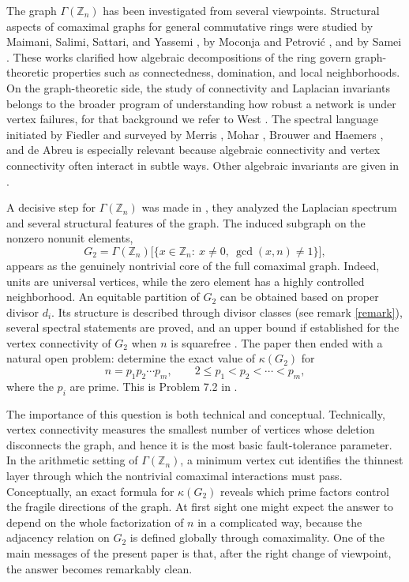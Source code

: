 \documentclass[12pt]{article}
\theoremstyle{definition}
\begin{document}
	The graph $\Gamma(\mathbb Z_n)$ has been investigated from several viewpoints. Structural aspects of comaximal graphs for general commutative rings were studied by Maimani, Salimi, Sattari, and Yassemi \cite{Maimani2008}, by Moconja and Petrović \cite{MoconjaPetrovic2011}, and by Samei \cite{Samei2014}. These works clarified how algebraic decompositions of the ring govern graph-theoretic properties such as connectedness, domination, and local neighborhoods. On the graph-theoretic side, the study of connectivity and Laplacian invariants belongs to the broader program of understanding how robust a network is under vertex failures, for that background we refer to West \cite{West2001}. The spectral language initiated by Fiedler \cite{Fiedler1973} and surveyed by Merris \cite{Merris1994}, Mohar \cite{Mohar1991}, Brouwer and Haemers \cite{BrouwerHaemers2012}, and de Abreu \cite{deAbreu2007} is especially relevant because algebraic connectivity and vertex connectivity often interact in subtle ways. Other algebraic invariants are given in \cite{bilalcumn,bilaliaaecc,bilaliac,bilalijaa,bilalijpam}.
	
	A decisive step for $\Gamma(\mathbb Z_n)$ was made in \cite{Banerjee2022,afkhami}, they analyzed the Laplacian spectrum and several structural features of the graph. The induced subgraph on the nonzero nonunit elements,
	$$
	G_2=\Gamma(\mathbb Z_n)\big[\{x\in \mathbb Z_n:\ x\neq 0,\ \gcd(x,n)\neq 1\}\big],
	$$
	appears as the genuinely nontrivial core of the full comaximal graph. Indeed, units are universal vertices, while the zero element has a highly controlled neighborhood. An equitable partition of $G_2$ can be obtained based on proper divisor $d_{i}$. Its structure is described through divisor classes (see remark \ref{remark}), several spectral statements are proved, and  an upper bound if established for the vertex connectivity of $G_2$ when $n$ is squarefree \cite{Banerjee2022,afkhami}. The paper \cite{Banerjee2022} then ended with a natural open problem: determine the exact value of $\kappa(G_2)$ for
	$$
	n=p_1p_2\cdots p_m,\qquad 2\leq p_1<p_2<\cdots<p_m,
	$$
	where the $p_i$ are prime. This is Problem 7.2 in \cite{Banerjee2022}.
	
	The importance of this question is both technical and conceptual. Technically, vertex connectivity measures the smallest number of vertices whose deletion disconnects the graph, and hence it is the most basic fault-tolerance parameter. In the arithmetic setting of $\Gamma(\mathbb Z_n)$, a minimum vertex cut identifies the thinnest layer through which the nontrivial comaximal interactions must pass. Conceptually, an exact formula for $\kappa(G_2)$ reveals which prime factors control the fragile directions of the graph. At first sight one might expect the answer to depend on the whole factorization of $n$ in a complicated way, because the adjacency relation on $G_2$ is defined globally through comaximality. One of the main messages of the present paper is that, after the right change of viewpoint, the answer becomes remarkably clean.
	
\end{document}
